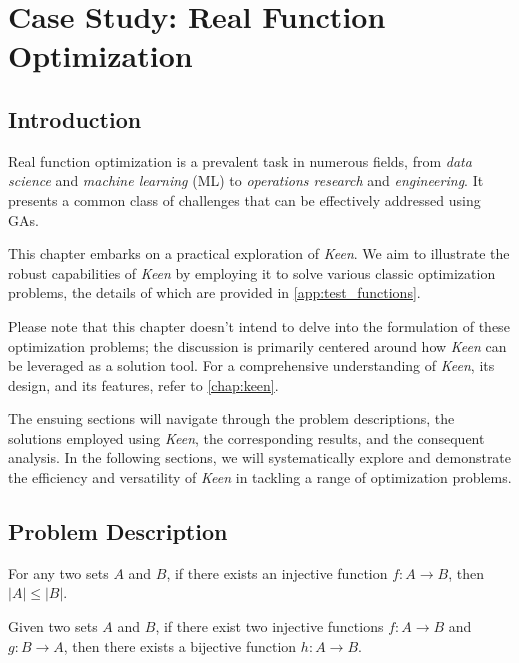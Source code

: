 \chapter{Case Study: Real Function Optimization}
\label{chap:fn_opt}
  \section{Introduction}
  \label{sec:fn_opt:intro}
    Real function optimization is a prevalent task in numerous fields, from 
    \textit{data science} and \textit{machine learning} (ML) to 
    \textit{operations research} and \textit{engineering}.
    It presents a common class of challenges that can be effectively addressed
    using GAs.

    This chapter embarks on a practical exploration of \textit{Keen}.
    We aim to illustrate the robust capabilities of \textit{Keen} by employing
    it to solve various classic optimization problems, the details of which are
    provided in \vref{app:test_functions}.

    Please note that this chapter doesn't intend to delve into the formulation
    of these optimization problems; the discussion is primarily centered around
    how \textit{Keen} can be leveraged as a solution tool.
    For a comprehensive understanding of \textit{Keen}, its design, and its
    features, refer to \vref{chap:keen}.
    
    The ensuing sections will navigate through the problem descriptions, the
    solutions employed using \textit{Keen}, the corresponding results, and the
    consequent analysis.
    In the following sections, we will systematically explore and demonstrate
    the efficiency and versatility of \textit{Keen} in tackling a range of
    optimization problems.

  \section{Problem Description}
  \label{sec:fn_opt:problem}
    \begin{definition}
    \label{def:fn_opt:cardinality_inequality}
      For any two sets \(A\) and \(B\), if there exists an injective function
      \(f : A \to B\), then \(|A| \leq |B|\).
    \end{definition}

    \begin{theorem}
    \label{thm:fn_opt:schroder_bernstein}
      Given two sets \(A\) and \(B\), if there exist two injective functions
      \(f : A \to B\) and \(g : B \to A\), then there exists a bijective
      function \(h : A \to B\).
    \end{theorem}

